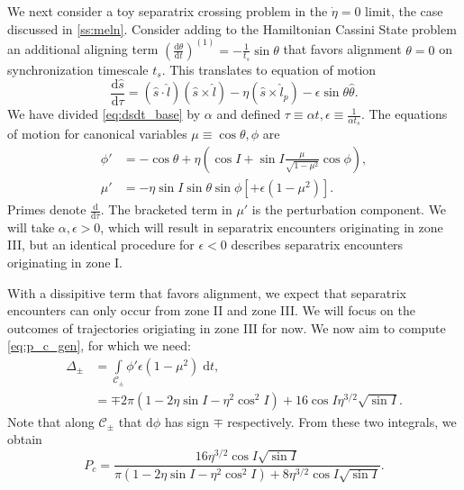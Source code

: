 \documentclass[
        fleqn,
        usenatbib,
    ]{mnras}
\newcommand*{\rd}[2]{\frac{\mathrm{d}#1}{\mathrm{d}#2}}
\newcommand*{\p}[1]{\left(#1\right)}
\newcommand*{\s}[1]{\left[#1\right]}
\begin{document}
We next consider a toy separatrix crossing problem in the $\dot{\eta} = 0$
limit, the case discussed in \autoref{ss:meln}. Consider adding to the
Hamiltonian Cassini State problem an additional aligning term
$\p{\rd{\theta}{t}}^{(1)} = -\frac{1}{t_s}\sin\theta$ that favors alignment
$\theta = 0$ on synchronization timescale $t_s$. This translates to equation of
motion
\begin{equation}
    \rd{\hat{s}}{\tau} = \p{\hat{s} \cdot \hat{l}}\p{\hat{s} \times \hat{l}}
        - \eta\p{\hat{s} \times \hat{l}_p}
        - \epsilon \sin \theta \hat{\theta}.
\end{equation}
We have divided \autoref{eq:dsdt_base} by $\alpha$ and defined $\tau \equiv
\alpha t, \epsilon \equiv \frac{1}{\alpha t_s}$. The equations of motion for
canonical variables $\mu \equiv \cos\theta, \phi$ are
\begin{subequations}\label{se:p2_eom}
    \begin{align}
        \phi' &= -\cos\theta
            + \eta\p{\cos I + \sin I \frac{\mu}{\sqrt{1 - \mu^2}} \cos \phi},\\
        \mu' &= -\eta \sin I \sin \theta \sin \phi
            \s{+ \epsilon\p{1 - \mu^2}}.
    \end{align}
\end{subequations}
Primes denote $\rd{}{\tau}$. The bracketed term in $\mu'$ is the perturbation
component. We will take $\alpha, \epsilon > 0$, which will result in separatrix
encounters originating in zone III, but an identical procedure for $\epsilon <
0$ describes separatrix encounters originating in zone I.

With a dissipitive term that favors alignment, we expect that separatrix
encounters can only occur from zone II and zone III\@. We will focus on the
outcomes of trajectories origiating in zone III for now. We now aim to compute
\autoref{eq:p_c_gen}, for which we need:
\begin{align}
    \Delta_\pm &= \int\limits_{\mathcal{C}_\pm}
            \phi'\epsilon\p{1 - \mu^2}\;\mathrm{d}t,\nonumber\\
        &= \mp 2\pi\p{1 - 2\eta \sin I - \eta^2 \cos^2 I}
                + 16\cos I \eta^{3/2}\sqrt{\sin I}.\label{eq:p2_delta}
\end{align}
Note that along $\mathcal{C}_{\pm}$ that $\mathrm{d}\phi$ has sign $\mp$
respectively. From these two integrals, we obtain
\begin{equation}
    P_c = \frac{16\eta^{3/2}\cos I \sqrt{\sin I}}{\pi
        \p{1 - 2\eta \sin I - \eta^2 \cos^2 I}
        + 8\eta^{3/2}\cos I \sqrt{\sin I}}.\label{eq:p1pc}
\end{equation}
\end{document}

